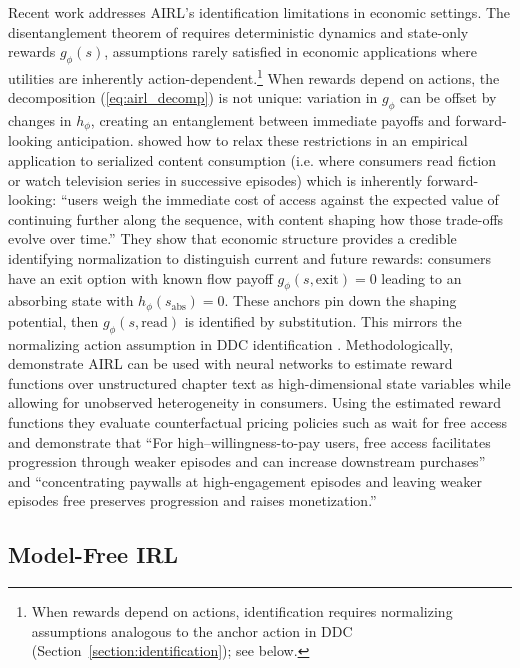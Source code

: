Recent work addresses AIRL's identification limitations in economic settings. The disentanglement theorem of \citet{fu:2018} requires deterministic dynamics and state-only rewards $g_\phi(s)$, assumptions rarely satisfied in economic applications where utilities are inherently action-dependent.\footnote{\footnotesize When rewards depend on actions, identification requires normalizing assumptions analogous to the anchor action in DDC (Section~\ref{section:identification}); see \citet{lee:2026} below.} When rewards depend on actions, the decomposition (\ref{eq:airl_decomp}) is not unique: variation in $g_\phi$ can be offset by changes in $h_\phi$, creating an entanglement between immediate payoffs and forward-looking anticipation. 
\citet{lee:2026} showed how to relax these restrictions in an empirical application to serialized content consumption (i.e. where consumers read fiction or
watch television series in successive episodes) which is inherently forward-looking: ``users weigh the immediate cost of access against the expected value of continuing further along the
sequence, with content shaping how those trade-offs evolve over time.''
They show that economic structure provides a credible identifying normalization to distinguish current and future rewards:
 consumers have an exit option with known flow payoff $g_\phi(s, \text{exit}) = 0$ leading to an absorbing state with $h_\phi(s_{\text{abs}}) = 0$. These anchors pin down the shaping potential, then $g_\phi(s, \text{read})$ is identified by substitution. This mirrors the normalizing action assumption in DDC identification \citep{rust:1994,magnacthesmar:2002}. Methodologically, \citet{lee:2026} demonstrate AIRL can be used with neural networks
to estimate reward functions over unstructured chapter text as high-dimensional state variables while allowing for unobserved
heterogeneity in consumers. Using the estimated reward functions  they evaluate counterfactual pricing policies such as
wait for free access and demonstrate that ``For high–willingness-to-pay users, free access facilitates progression
through weaker episodes and can increase downstream purchases'' and ``concentrating paywalls at
high-engagement episodes and leaving weaker episodes free preserves progression and raises monetization.''

\subsection{Model-Free IRL}

